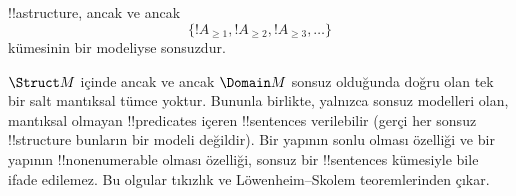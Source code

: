 \documentclass[../../../include/open-logic-section]{subfiles}
\begin{document}
\begin{prop}
!!a{structure}, ancak ve ancak
\[
\{!A_{\ge 1}, !A_{\ge 2}, !A_{\ge 3}, \dots \}
\]
kümesinin bir modeliyse sonsuzdur.
\end{prop}

$\Struct M$ içinde ancak ve ancak $\Domain M$ sonsuz olduğunda doğru
olan tek bir salt mantıksal tümce yoktur. Bununla birlikte, yalnızca
sonsuz modelleri olan, mantıksal olmayan !!{predicate}s içeren
!!{sentence}s verilebilir (gerçi her sonsuz !!{structure} bunların bir
modeli değildir). Bir yapının sonlu olması özelliği ve bir yapının
!!{nonenumerable} olması özelliği, sonsuz bir !!{sentence}s kümesiyle
bile ifade edilemez. Bu olgular tıkızlık ve Löwenheim--Skolem
teoremlerinden çıkar.
\end{document}
